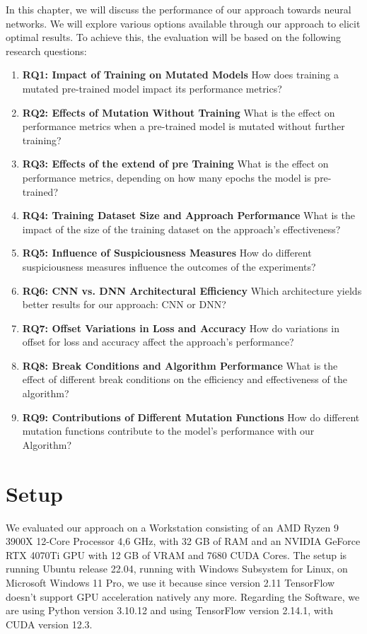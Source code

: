In this chapter, we will discuss the performance of our approach towards neural networks.
We will explore various options available through our approach to elicit optimal results.
To achieve this, the evaluation will be based on the following research questions:
\begin{enumerate}
    \item[]\textbf{RQ1: Impact of Training on Mutated Models} How does training a mutated pre-trained model impact its performance metrics?
    \item[]\textbf{RQ2: Effects of Mutation Without Training} What is the effect on performance metrics when a pre-trained model is mutated without further training?
    \item[]\textbf{RQ3: Effects of the extend of pre Training} What is the effect on performance metrics, depending on how many epochs the model is pre-trained?
    \item[]\textbf{RQ4: Training Dataset Size and Approach Performance} What is the impact of the size of the training dataset on the approach's effectiveness?
    \item[]\textbf{RQ5: Influence of Suspiciousness Measures} How do different suspiciousness measures influence the outcomes of the experiments?
    \item[]\textbf{RQ6: CNN vs. DNN Architectural Efficiency} Which architecture yields better results for our approach: CNN or DNN?
    \item[]\textbf{RQ7: Offset Variations in Loss and Accuracy} How do variations in offset for loss and accuracy affect the approach's performance?
    \item[]\textbf{RQ8: Break Conditions and Algorithm Performance} What is the effect of different break conditions on the efficiency and effectiveness of the algorithm?
    \item[]\textbf{RQ9: Contributions of Different Mutation Functions} How do different mutation functions contribute to the model's performance with our Algorithm?
\end{enumerate}
\section{Setup}\label{sec:setup}

We evaluated our approach on a Workstation consisting of an AMD Ryzen 9 3900X 12-Core Processor 4,6 GHz, with 32 GB of RAM and an NVIDIA GeForce RTX 4070Ti GPU with 12 GB of VRAM and 7680 CUDA Cores.
The setup is running Ubuntu release 22.04, running with Windows Subsystem for Linux, on Microsoft Windows 11 Pro, we use it because since version 2.11\cite{noauthor_build_2023} TensorFlow doesn't support GPU acceleration natively any more.
Regarding the Software, we are using Python version 3.10.12 and using TensorFlow version 2.14.1, with CUDA version 12.3.

